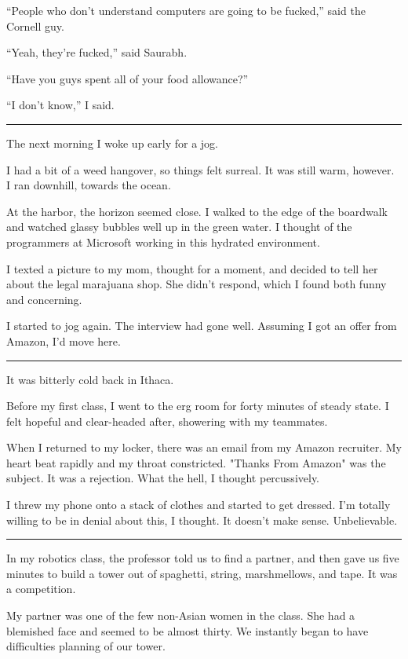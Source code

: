 ``People who don't understand computers are going to be fucked,''
said the Cornell guy.

``Yeah, they're fucked,'' said Saurabh.  

``Have you guys spent all of your food allowance?''

``I don't know,'' I said.

\plainfancybreak{12pt}{2}{* * *}

The next morning I woke up early for a jog.

I had a bit of a weed hangover, so things felt surreal.  It was still warm,
however.  I ran downhill, towards the ocean.

At the harbor, the horizon seemed close.  I walked to the edge of the boardwalk
and watched glassy bubbles well up in the green water.  I thought of the
programmers at Microsoft working in this hydrated environment. 

I texted a picture to my mom, thought for a moment, and decided to tell her
about the legal marajuana shop.  She didn't respond, which I found both funny
and concerning. 

I started to jog again.  The interview had gone well.  Assuming I got an
offer from Amazon, I'd move here. 

\plainfancybreak{12pt}{2}{* * *}

It was bitterly cold back in Ithaca.

Before my first class, I went to the erg room for forty minutes of steady state.
I felt hopeful and clear-headed after, showering with my teammates.

When I returned to my locker, there was an email from my Amazon recruiter.  My
heart beat rapidly and my throat constricted.  "Thanks From Amazon" was the
subject.  It was a rejection.  What the hell, I thought percussively. 

I threw my phone onto a stack of clothes and started to get dressed.  I'm
totally willing to be in denial about this, I thought.  It doesn't make sense.
Unbelievable. 

\plainfancybreak{12pt}{2}{* * *}

In my robotics class, the professor told us to find a partner, and then gave us
five minutes to build a tower out of spaghetti, string, marshmellows, and tape.
It was a competition.

My partner was one of the few non-Asian women in the class.  She had a blemished
face and seemed to be almost thirty.  We instantly began to have difficulties
planning of our tower.  

